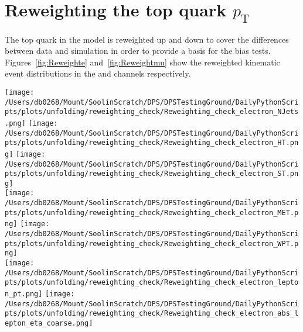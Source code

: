 \chapter{Reweighting the top quark $\mathbf{\mathit{p}_{\mathrm{T}}}$} %
\label{ch:pt_reweight}

The top quark \pt{} in the \powhegpythia{} model is reweighted up and down to cover the differences between data and simulation in order to provide a basis for the bias tests.
Figures~\ref{fig:Reweighte} and~\ref{fig:Reweightmu} show the reweighted kinematic event distributions in the \eJets{} and \muJets{} channels respectively.

\begin{figure*}[htpb]
	\centering
	\texttt{[image: /Users/db0268/Mount/SoolinScratch/DPS/DPSTestingGround/DailyPythonScripts/plots/unfolding/reweighting\_check/Reweighting\_check\_electron\_NJets.png]} 
	\texttt{[image: /Users/db0268/Mount/SoolinScratch/DPS/DPSTestingGround/DailyPythonScripts/plots/unfolding/reweighting\_check/Reweighting\_check\_electron\_HT.png]} 
	\texttt{[image: /Users/db0268/Mount/SoolinScratch/DPS/DPSTestingGround/DailyPythonScripts/plots/unfolding/reweighting\_check/Reweighting\_check\_electron\_ST.png]} \\
	\texttt{[image: /Users/db0268/Mount/SoolinScratch/DPS/DPSTestingGround/DailyPythonScripts/plots/unfolding/reweighting\_check/Reweighting\_check\_electron\_MET.png]} 
	\texttt{[image: /Users/db0268/Mount/SoolinScratch/DPS/DPSTestingGround/DailyPythonScripts/plots/unfolding/reweighting\_check/Reweighting\_check\_electron\_WPT.png]} \\
	\texttt{[image: /Users/db0268/Mount/SoolinScratch/DPS/DPSTestingGround/DailyPythonScripts/plots/unfolding/reweighting\_check/Reweighting\_check\_electron\_lepton\_pt.png]} 
	\texttt{[image: /Users/db0268/Mount/SoolinScratch/DPS/DPSTestingGround/DailyPythonScripts/plots/unfolding/reweighting\_check/Reweighting\_check\_electron\_abs\_lepton\_eta\_coarse.png]} \\
	\caption[The kinematic event distributions given by the \powhegpythia{} sample (green) with the top quark \pt{} reweighted up (red) and down (blue) to cover differences to data (magenta) in the \eJets{} channel. The distributions are normalised to one.]{The kinematic event distributions given by the \powhegpythia{} sample (green) with the top quark \pt{} reweighted up (red) and down (blue) to cover differences to data (magenta) in the \eJets{} channel. The distributions are normalised to one.}
	\label{fig:Reweighte}
\end{figure*}
